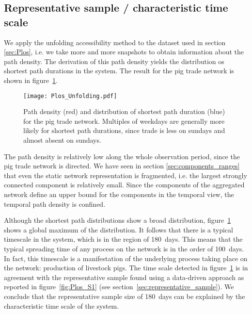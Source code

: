 \subsection{Representative sample / characteristic time scale}
We apply the unfolding accessibility method to the dataset used in section \ref{sec:Plos}, i.e. we take more and more snapshots to obtain information about the path density.
The derivation of this path density yields the distribution os shortest path durations in the system.
The result for the pig trade network is shown in figure~\ref{fig:plos_unfolding}.
%
\begin{figure}[htb]
\begin{center}
\texttt{[image: Plos\_Unfolding.pdf]}
\caption{Path density (red) and distribution of shortest path duration (blue) for the pig trade network.
Multiples of weekdays are generally more likely for shortest path durations, since trade is less on sundays and almost absent on sundays.}
\label{fig:plos_unfolding}
\end{center}
\end{figure}
%
The path density is relatively low along the whole observation period, since the pig trade network is directed.
We have seen in section \ref{sec:components_ranges} that even the static network representation is fragmented, i.e. the largest strongly connected component is relatively small.
Since the components of the aggregated network define an upper bound for the components in the temporal view, the temporal path density is confined.

Although the shortest path distributions show a broad distribution, figure~\ref{fig:plos_unfolding} shows a global maximum of the distribution.
It follows that there is a typical timescale in the system, which is in the region of 180~days.
This means that the typical spreading time of any process on the network is in the order of 100~days.
In fact, this timescale is a manifestation of the underlying process taking place on the network: production of livestock pigs.
The time scale detected in figure~\ref{fig:plos_unfolding} is in agreement with the representative sample found using a data-driven approach as reported in figure~\ref{fig:Plos_S1} (see section~\ref{sec:representative_sample}).
We conclude that the representative sample size of 180~days can be explained by the characteristic time scale of the system.

